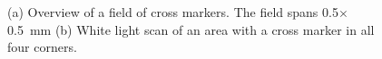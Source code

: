 	\begin{figure}[tp]
		\begin{subfigure}[t]{ 0.49\linewidth}
			\centering
			\caption{}
			\label{subfig::cross_markers}
		\end{subfigure}
		\hfill
		\begin{subfigure}[t]{ 0.49\linewidth}
			\centering
			\caption{}
			\label{subfig::cross_marker_whitelightscan}
		\end{subfigure}
		\caption{(a) Overview of a field of cross markers. The field spans \num{0.5}\ensuremath{\times}\SI{0.5}{\milli\meter} (b) White light scan of an area with a cross marker in all four corners.}
		\label{fig::<fig>}
	\end{figure}

